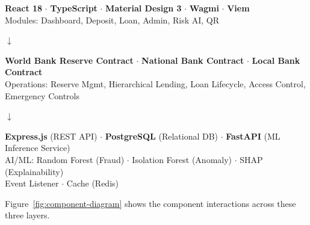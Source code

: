 \documentclass[12pt,a4paper]{report}
\begin{document}
\vspace{6pt}
\begin{minipage}{\textwidth}
\begin{center}
\begin{tcolorbox}[colback=white,colframe=black,coltitle=white,fonttitle=\bfseries\small,title={PRESENTATION LAYER},boxrule=0.8pt,arc=3pt,left=6pt,right=6pt,top=4pt,bottom=4pt]
\textbf{React 18} \(\cdot\) \textbf{TypeScript} \(\cdot\) \textbf{Material Design 3} \(\cdot\) \textbf{Wagmi} \(\cdot\) \textbf{Viem}\\[4pt]
{\small Modules: Dashboard, Deposit, Loan, Admin, Risk AI, QR}
\end{tcolorbox}

\vspace{2pt}
{\Large $\boldsymbol{\downarrow}$}
\vspace{2pt}

\begin{tcolorbox}[colback=white,colframe=black,coltitle=white,fonttitle=\bfseries\small,title={SMART CONTRACT LAYER \normalfont\small(EVM: Ethereum / Polygon)},boxrule=0.8pt,arc=3pt,left=6pt,right=6pt,top=4pt,bottom=4pt]
\textbf{World Bank Reserve Contract} \(\cdot\) \textbf{National Bank Contract} \(\cdot\) \textbf{Local Bank Contract}\\[4pt]
{\small Operations: Reserve Mgmt, Hierarchical Lending, Loan Lifecycle, Access Control, Emergency Controls}
\end{tcolorbox}

\vspace{2pt}
{\Large $\boldsymbol{\downarrow}$}
\vspace{2pt}

\begin{tcolorbox}[colback=white,colframe=black,coltitle=white,fonttitle=\bfseries\small,title={OFF-CHAIN SERVICES LAYER},boxrule=0.8pt,arc=3pt,left=6pt,right=6pt,top=4pt,bottom=4pt]
\textbf{Express.js} (REST API) \(\cdot\) \textbf{PostgreSQL} (Relational DB) \(\cdot\) \textbf{FastAPI} (ML Inference Service)\\[4pt]
{\small AI/ML: Random Forest (Fraud) \(\cdot\) Isolation Forest (Anomaly) \(\cdot\) SHAP (Explainability)}\\[2pt]
{\small Event Listener \(\cdot\) Cache (Redis)}
\end{tcolorbox}
\end{center}
\end{minipage}
\vspace{6pt}

Figure~\ref{fig:component-diagram} shows the component interactions across these three layers.
\end{document}
